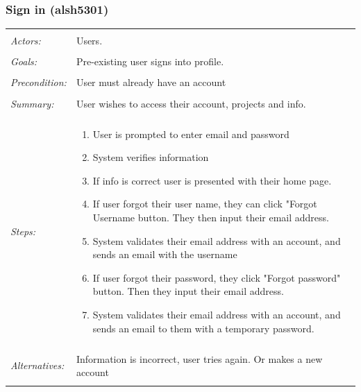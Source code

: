 \documentclass[11pt]{report}
\begin{document}
\subsubsection{Sign in (alsh5301)}
\begin{tabular}{ p{2cm} p{12cm} }
 \hline
 \\
 \textit{Actors:} & Users. \\ 
 \\
 \textit{Goals:} & Pre-existing user signs into profile. \\
 \\
\textit{Precondition:} & User must already have an account \\
\\
\textit{Summary:} & User wishes to access their account, projects and info. \\
\\
 \textit{Steps:} & \begin{enumerate}
  \item User is prompted to enter email and password 
  \item System verifies information
  \item If info is correct user is presented with their home page. 
  \item If user forgot their user name, they can click "Forgot Username button. They then input their email address.
  \item System validates their email address with an account, and sends an email with the username  
  \item If user forgot their password, they click "Forgot password" button. Then they input their email address.
  \item System validates their email address with an account, and sends an email to them with a temporary password.
 \end{enumerate} \\
 \\
 \textit{Alternatives:} & Information is incorrect, user tries again. Or makes a new account \\
 \\
\hline
\end{tabular}
\end{document}
